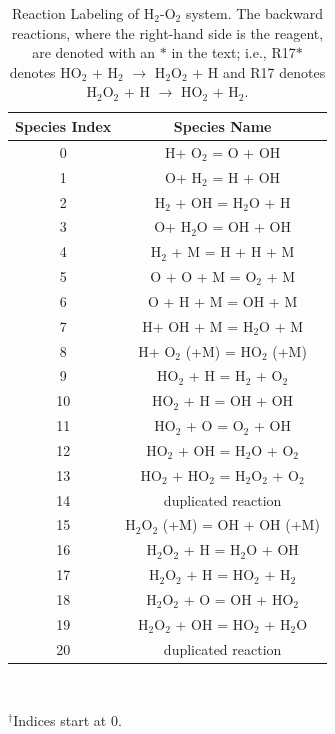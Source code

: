 \begin{table}[htbp]
    \caption[Reaction Labeling of H$_2$-O$_2$ system]{Reaction Labeling of H$_2$-O$_2$ system. The backward reactions, where the
right-hand side is the reagent, are denoted with an $\ast$ in the text; i.e.,
R17$\ast$ denotes HO$_2$ + H$_2$ $\rightarrow$ H$_2$O$_2$ + H and R17 denotes H$_2$O$_2$ + H $\rightarrow$
HO$_2$ + H$_2$.}
    \begin{center}
    \begin{tabular}{||c|c||} \hline
    Species Index & Species Name\\ \hline
	0  & H+ O$_2$ = O + OH \\ \hline
	1  & O+ H$_2$ = H + OH \\ \hline
	2  & H$_2$ + OH = H$_2$O + H \\ \hline
	3  & O+ H$_2$O = OH + OH \\ \hline
	4  & H$_2$ + M = H + H + M \\ \hline
	5  & O + O + M = O$_2$ + M \\ \hline
	6  & O + H + M = OH + M \\ \hline
	7  & H+ OH + M = H$_2$O + M \\ \hline
	8  & H+ O$_2$ (+M) = HO$_2$ (+M) \\ \hline
	9  & HO$_2$ + H = H$_2$ + O$_2$ \\ \hline
	10  & HO$_2$ + H = OH + OH \\ \hline
	11  & HO$_2$ + O = O$_2$ + OH \\ \hline
	12  & HO$_2$ + OH = H$_2$O + O$_2$ \\ \hline
	13  & HO$_2$ + HO$_2$ = H$_2$O$_2$ + O$_2$ \\ \hline
	14  & duplicated reaction \\ \hline
	15  & H$_2$O$_2$ (+M) = OH + OH (+M) \\ \hline
	16  & H$_2$O$_2$ + H = H$_2$O + OH \\ \hline
	17  & H$_2$O$_2$ + H = HO$_2$ + H$_2$ \\ \hline
	18  & H$_2$O$_2$ + O = OH + HO$_2$ \\ \hline
	19  & H$_2$O$_2$ + OH = HO$_2$ + H$_2$O \\ \hline
	20  & duplicated reaction \\ \hline
	\end{tabular}
   \\ \rule{0mm}{5mm}
   ${}^\dagger$Indices start at 0.		%
\end{center}
\label{ch3:rxn_label}
\end{table}
